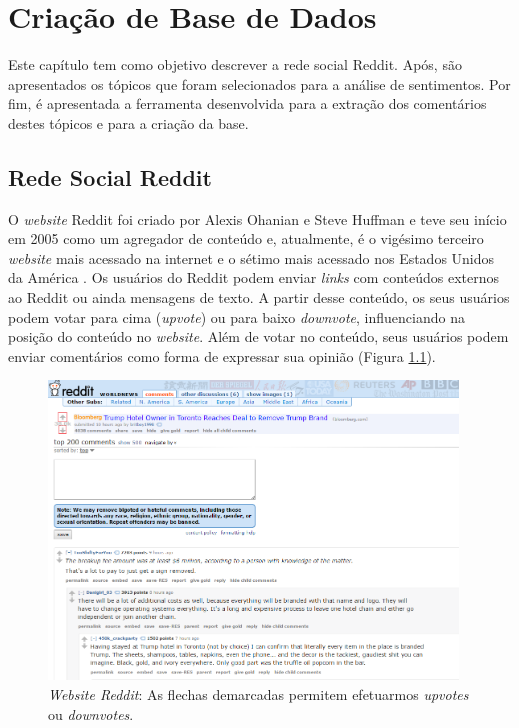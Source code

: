 \chapter{Criação de Base de Dados}
\label{cap:banco}
Este capítulo tem como objetivo descrever a rede social Reddit.
Após, são apresentados os tópicos que foram selecionados para a análise de
sentimentos. Por fim, é apresentada a ferramenta desenvolvida para a extração
dos comentários destes tópicos e para a criação da base.
\section{Rede Social Reddit}
\label{cap:Reddit}

O \textit{website} Reddit foi criado por Alexis Ohanian e Steve Huffman e teve
seu início em 2005 como um agregador de conteúdo e, atualmente, é o vigésimo terceiro \textit{website} mais acessado na
internet e o sétimo mais acessado nos Estados Unidos da América \cite{alexa}.
Os usuários do Reddit podem enviar \textit{links} com conteúdos externos
ao Reddit ou ainda mensagens de texto. A partir desse conteúdo, os seus
usuários podem votar para cima (\textit{upvote}) ou para baixo \textit{downvote},
influenciando na posição do conteúdo no \textit{website}. Além de votar no conteúdo, seus usuários podem enviar comentários como
forma de expressar sua opinião (Figura \ref{fig:reddit}).

\newpage

\begin{figure}[!htbp]
\centering
\includegraphics[height=300px]{imagens/reddit.png}
\caption{\textit{Website Reddit}:  As flechas demarcadas permitem efetuarmos
\textit{upvotes} ou \textit{downvotes}.}
\label{fig:reddit}
\end{figure}

